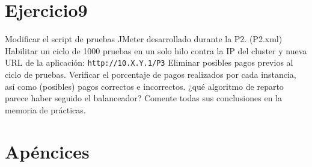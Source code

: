\documentclass[a4paper, 10pt]{article}
\begin{document}
\section{Ejercicio9}
\begin{mdframed}
	Modificar el script de pruebas JMeter desarrollado durante la P2. (P2.xml) Habilitar un ciclo de
	1000 pruebas en un solo hilo contra la IP del cluster y nueva URL de la aplicación:
	\texttt{http://10.X.Y.1/P3}
	Eliminar posibles pagos previos al ciclo de pruebas. Verificar el porcentaje de pagos realizados por cada
	instancia, así como (posibles) pagos correctos e incorrectos. ¿qué algoritmo de reparto parece haber
	seguido el balanceador? Comente todas sus conclusiones en la memoria de prácticas. 
\end{mdframed}

\newpage
\appendix
\section{Apéncices}
\end{document}
